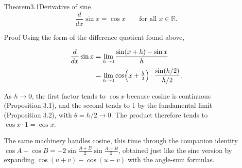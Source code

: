 \documentclass[a4paper,12pt,oneside]{memoir}
\begin{document}
\begin{envtheorem}{Theorem}{3.1}{Derivative of sine}
\[ \frac{d}{dx}\sin x = \cos x \qquad \text{for all } x \in \mathbb{R}. \]
\end{envtheorem}
\begin{envproof}{Proof}{}{}
Using the form of the difference quotient found above,

\[ \begin{aligned}
        \frac{d}{dx}\sin x &= \lim_{h \to 0} \frac{\sin(x + h) - \sin x}{h} \\[2pt]
          &= \lim_{h \to 0} \cos\Bigl(x + \tfrac{h}{2}\Bigr) \cdot \frac{\sin(h/2)}{h/2}.
      \end{aligned} \]

As \(h \to 0\), the first factor tends to \(\cos x\) because cosine is continuous (Proposition 3.1), and the second tends to \(1\) by the fundamental limit (Proposition 3.2), with \(\theta = h/2 \to 0\). The product therefore tends to \(\cos x \cdot 1 = \cos x\).
\end{envproof}
The same machinery handles cosine, this time through the companion identity \(\cos A - \cos B = -2 \sin\frac{A + B}{2} \sin\frac{A - B}{2}\), obtained just like the sine version by expanding \(\cos(u + v) - \cos(u - v)\) with the angle-sum formulas.
\end{document}
